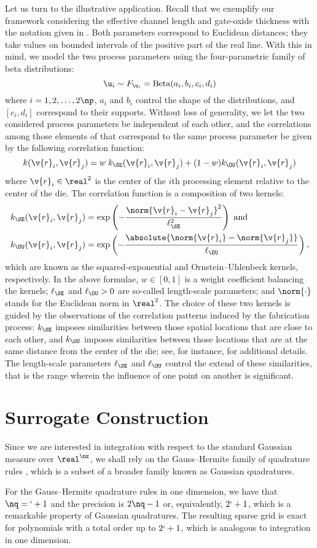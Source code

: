 Let us turn to the illustrative application. Recall that we exemplify our
framework considering the effective channel length and gate-oxide thickness with
the notation given in . Both parameters
correspond to Euclidean distances; they take values on bounded intervals of the
positive part of the real line. With this in mind, we model the two process
parameters using the four-parametric family of beta distributions:
\[
  \u_i \sim F_{\u_i} = \mathrm{Beta}(a_i, b_i, c_i, d_i)
\]
where $i = 1, 2, \dots, 2 \np$, $a_i$ and $b_i$ control the shape of the
distributions, and $[c_i, d_i]$ correspond to their supports. Without loss of
generality, we let the two considered process parameters be independent of each
other, and the correlations among those elements of \vu that correspond to the
same process parameter be given by the following correlation function:
\[
  k(\v{r}_i, \v{r}_j) = w \; k_\SE(\v{r}_i, \v{r}_j) + (1 - w) k_\OU(\v{r}_i, \v{r}_j)
\]
where $\v{r}_i \in \real^2$ is the center of the $i$th processing element
relative to the center of the die. The correlation function is a composition of
two kernels:
\begin{align*}
  & k_\SE(\v{r}_i, \v{r}_j) = \exp\left(- \frac{\norm{\v{r}_i - \v{r}_j}^2}{\ell_\SE^2} \right) \text{ and} \\
  & k_\OU(\v{r}_i, \v{r}_j) = \exp\left(- \frac{\absolute{\norm{\v{r}_i} - \norm{\v{r}_j}}}{\ell_\OU} \right),
\end{align*}
which are known as the squared-exponential and Ornstein--Uhlenbeck kernels,
respectively. In the above formulae, $w \in [0, 1]$ is a weight coefficient
balancing the kernels; $\ell_\SE$ and $\ell_\OU > 0$ are so-called length-scale
parameters; and $\norm{\cdot}$ stands for the Euclidean norm in $\real^2$. The
choice of these two kernels is guided by the observations of the correlation
patterns induced by the fabrication process: $k_\SE$ imposes similarities
between those spatial locations that are close to each other, and $k_\OU$
imposes similarities between those locations that are at the same distance from
the center of the die; see, for instance, \cite{friedberg2005} for additional
details. The length-scale parameters $\ell_\SE$ and $\ell_\OU$ control the
extend of these similarities, that is the range wherein the influence of one
point on another is significant.

\section{Surrogate Construction}

Since we are interested in integration with respect to the standard Gaussian
measure over $\real^\nz$, we shall rely on the Gauss--Hermite family of
quadrature rules \cite{maitre2010}, which is a subset of a broader family known
as Gaussian quadratures.

For the Gauss--Hermite quadrature rules in one dimension, we have that $\nq =
\lq + 1$ and the precision is $2 \nq - 1$ \cite{heiss2008} or, equivalently, $2
\lq + 1$, which is a remarkable property of Gaussian quadratures. The resulting
sparse grid is exact for polynomials with a total order up to $2 \lq + 1$, which
is analogous to integration in one dimension.

